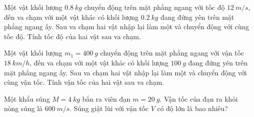 \begin{ex}
Một vật khối lượng $\SI{0.8}{kg}$ chuyển động trên mặt phẳng ngang với tốc độ $\SI{12}{m/s}$, đến va chạm với một vật khác có khối lượng $\SI{0.2}{kg}$ đang đứng yên trên mặt phẳng ngang ấy. Sau va chạm hai vật nhập lại làm một và chuyển động với cùng tốc độ. Tính tốc độ của hai vật sau va chạm.	
\end{ex}
\begin{ex}
Một vật khối lượng $m_1=\SI{400}{g}$ chuyển động trên mặt phẳng ngang với vận tốc $\SI{18}{km/h}$, đến va chạm với một vật khác có khối lượng $\SI{100}{g}$ đang đứng yên trên mặt phẳng ngang ấy. Sau va chạm hai vật nhập lại làm một và chuyển động với cùng vận tốc. Tính vận tốc của hai vật sau va chạm.	
\end{ex}		
\begin{ex}
Một khẩu súng $M = \SI{4}{kg}$ bắn ra viên đạn $m = \SI{20}{g}$. Vận tốc của đạn ra khỏi nòng súng là $\SI{600}{m/s}$. Súng giật lùi với vận tốc $V$ có độ lớn là bao nhiêu?	
\end{ex}
